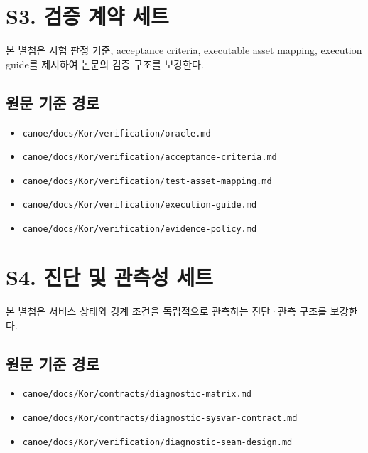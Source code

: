\documentclass[8pt,a4paper]{article}
\begin{document}

\clearpage

\clearpage

\clearpage

\clearpage

\clearpage

\clearpage

\clearpage

\section*{S3. 검증 계약 세트}
본 별첨은 시험 판정 기준, acceptance criteria, executable asset mapping, execution guide를 제시하여 논문의 검증 구조를 보강한다.

\subsection*{원문 기준 경로}
\begin{itemize}
\item \texttt{canoe/docs/Kor/verification/oracle.md}
\item \texttt{canoe/docs/Kor/verification/acceptance-criteria.md}
\item \texttt{canoe/docs/Kor/verification/test-asset-mapping.md}
\item \texttt{canoe/docs/Kor/verification/execution-guide.md}
\item \texttt{canoe/docs/Kor/verification/evidence-policy.md}
\end{itemize}


\clearpage

\clearpage

\clearpage

\clearpage

\clearpage

\section*{S4. 진단 및 관측성 세트}
본 별첨은 서비스 상태와 경계 조건을 독립적으로 관측하는 진단·관측 구조를 보강한다.

\subsection*{원문 기준 경로}
\begin{itemize}
\item \texttt{canoe/docs/Kor/contracts/diagnostic-matrix.md}
\item \texttt{canoe/docs/Kor/contracts/diagnostic-sysvar-contract.md}
\item \texttt{canoe/docs/Kor/verification/diagnostic-seam-design.md}
\end{itemize}


\clearpage

\clearpage

\end{document}
